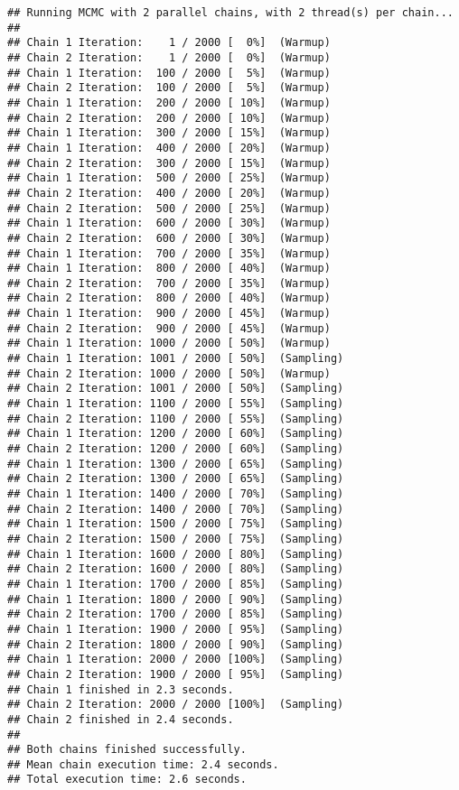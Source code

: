 \documentclass[
]{article}
\begin{document}
\begin{verbatim}
## Running MCMC with 2 parallel chains, with 2 thread(s) per chain...
## 
## Chain 1 Iteration:    1 / 2000 [  0%]  (Warmup) 
## Chain 2 Iteration:    1 / 2000 [  0%]  (Warmup) 
## Chain 1 Iteration:  100 / 2000 [  5%]  (Warmup) 
## Chain 2 Iteration:  100 / 2000 [  5%]  (Warmup) 
## Chain 1 Iteration:  200 / 2000 [ 10%]  (Warmup) 
## Chain 2 Iteration:  200 / 2000 [ 10%]  (Warmup) 
## Chain 1 Iteration:  300 / 2000 [ 15%]  (Warmup) 
## Chain 1 Iteration:  400 / 2000 [ 20%]  (Warmup) 
## Chain 2 Iteration:  300 / 2000 [ 15%]  (Warmup) 
## Chain 1 Iteration:  500 / 2000 [ 25%]  (Warmup) 
## Chain 2 Iteration:  400 / 2000 [ 20%]  (Warmup) 
## Chain 2 Iteration:  500 / 2000 [ 25%]  (Warmup) 
## Chain 1 Iteration:  600 / 2000 [ 30%]  (Warmup) 
## Chain 2 Iteration:  600 / 2000 [ 30%]  (Warmup) 
## Chain 1 Iteration:  700 / 2000 [ 35%]  (Warmup) 
## Chain 1 Iteration:  800 / 2000 [ 40%]  (Warmup) 
## Chain 2 Iteration:  700 / 2000 [ 35%]  (Warmup) 
## Chain 2 Iteration:  800 / 2000 [ 40%]  (Warmup) 
## Chain 1 Iteration:  900 / 2000 [ 45%]  (Warmup) 
## Chain 2 Iteration:  900 / 2000 [ 45%]  (Warmup) 
## Chain 1 Iteration: 1000 / 2000 [ 50%]  (Warmup) 
## Chain 1 Iteration: 1001 / 2000 [ 50%]  (Sampling) 
## Chain 2 Iteration: 1000 / 2000 [ 50%]  (Warmup) 
## Chain 2 Iteration: 1001 / 2000 [ 50%]  (Sampling) 
## Chain 1 Iteration: 1100 / 2000 [ 55%]  (Sampling) 
## Chain 2 Iteration: 1100 / 2000 [ 55%]  (Sampling) 
## Chain 1 Iteration: 1200 / 2000 [ 60%]  (Sampling) 
## Chain 2 Iteration: 1200 / 2000 [ 60%]  (Sampling) 
## Chain 1 Iteration: 1300 / 2000 [ 65%]  (Sampling) 
## Chain 2 Iteration: 1300 / 2000 [ 65%]  (Sampling) 
## Chain 1 Iteration: 1400 / 2000 [ 70%]  (Sampling) 
## Chain 2 Iteration: 1400 / 2000 [ 70%]  (Sampling) 
## Chain 1 Iteration: 1500 / 2000 [ 75%]  (Sampling) 
## Chain 2 Iteration: 1500 / 2000 [ 75%]  (Sampling) 
## Chain 1 Iteration: 1600 / 2000 [ 80%]  (Sampling) 
## Chain 2 Iteration: 1600 / 2000 [ 80%]  (Sampling) 
## Chain 1 Iteration: 1700 / 2000 [ 85%]  (Sampling) 
## Chain 1 Iteration: 1800 / 2000 [ 90%]  (Sampling) 
## Chain 2 Iteration: 1700 / 2000 [ 85%]  (Sampling) 
## Chain 1 Iteration: 1900 / 2000 [ 95%]  (Sampling) 
## Chain 2 Iteration: 1800 / 2000 [ 90%]  (Sampling) 
## Chain 1 Iteration: 2000 / 2000 [100%]  (Sampling) 
## Chain 2 Iteration: 1900 / 2000 [ 95%]  (Sampling) 
## Chain 1 finished in 2.3 seconds.
## Chain 2 Iteration: 2000 / 2000 [100%]  (Sampling) 
## Chain 2 finished in 2.4 seconds.
## 
## Both chains finished successfully.
## Mean chain execution time: 2.4 seconds.
## Total execution time: 2.6 seconds.
\end{verbatim}
\end{document}
